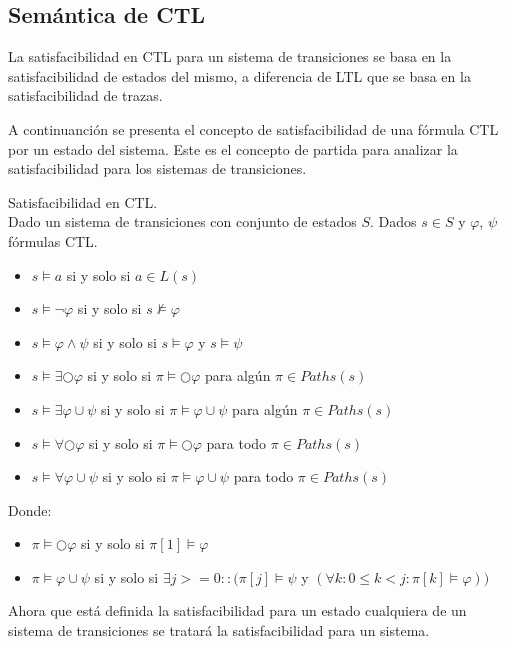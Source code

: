 \subsection{Semántica de CTL}
La satisfacibilidad en CTL para un sistema de transiciones se basa en la satisfacibilidad
 de estados del mismo, a diferencia de LTL que se basa en la satisfacibilidad de trazas.

A continuanción se presenta el concepto de satisfacibilidad de una fórmula CTL por un estado
 del sistema.
Este es el concepto de partida para analizar la satisfacibilidad para los sistemas de transiciones.

\begin{definicion}
Satisfacibilidad en CTL.\\
Dado un sistema de transiciones con conjunto de estados $S$. Dados $s \in S$ y $\varphi$, $\psi$
 fórmulas CTL.
\begin{itemize}
\item $s \models a$ si y solo si $a \in L(s)$
\item $s \models \neg \varphi $ si y solo si $s \not\models \varphi $
\item $s \models \varphi \wedge \psi $ si y solo si $s \models \varphi $ y $s \models \psi $
\item $s \models \exists \bigcirc \varphi $ si y solo si $\pi \models \bigcirc \varphi $ para algún $\pi \in Paths(s)$
\item $s \models \exists \varphi \cup \psi $ si y solo si $\pi \models \varphi \cup \psi $ para algún $\pi \in Paths(s)$
\item $s \models \forall \bigcirc \varphi $ si y solo si $\pi \models \bigcirc \varphi $ para todo $\pi \in Paths(s)$
\item $s \models \forall \varphi \cup \psi $ si y solo si $\pi \models \varphi \cup \psi $ para todo $\pi \in Paths(s)$

\end{itemize}

Donde:
\begin{itemize}
\item $\pi \models \bigcirc \varphi $ si y solo si $\pi [1] \models \varphi $
\item $\pi \models \varphi \cup \psi $ si y solo si $\exists j >= 0::(\pi [j] \models \psi $ y $(\forall k:0 \le k < j:\pi [k] \models \varphi))$
\end{itemize}
\end{definicion}

Ahora que está definida la satisfacibilidad para un estado cualquiera de un sistema de transiciones
 se tratará la satisfacibilidad para un sistema.
 
